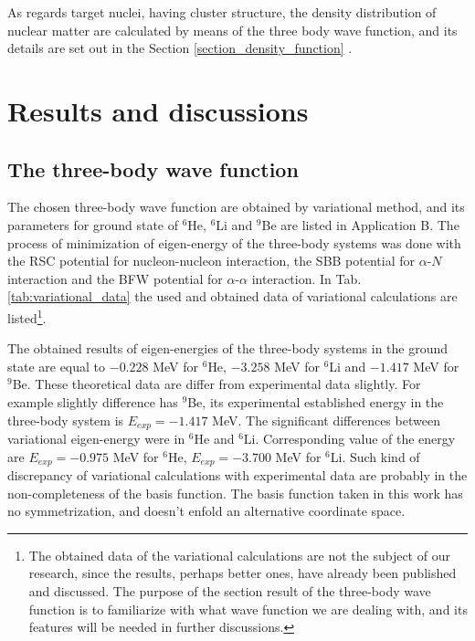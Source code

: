 \documentclass[
12pt, %
oneside, %
english, %
onehalfspacing, %
onehalfspacing, %
headsepline, %
]{MastersDoctoralThesis} %
\begin{document}
  
As regards target nuclei, having cluster structure, the density distribution of nuclear matter are calculated by means of the three body wave function, and its details are set out in the Section \ref{section_density_function} .

\chapter{Results and discussions}

\section{The three-body wave function}

The chosen three-body wave function are obtained by variational method, and its parameters for ground state of $^6$He, $^6$Li and $^9$Be are listed in Application B. The process of minimization of eigen-energy of the three-body systems was done with the RSC potential \cite{day1981three} for nucleon-nucleon interaction, the SBB potential \cite{sack1954elastic} for  $\alpha$-$N$ interaction and the BFW potential \cite{buck1977local} for $\alpha$-$\alpha$ interaction.  In Tab. \ref{tab:variational_data} the used and obtained data of variational calculations are listed\footnote{The obtained data of the variational calculations are not the subject of our research, since the results, perhaps better ones, have already been published and discussed. The purpose of  the section result of the three-body wave function   is to familiarize with what wave function we are dealing with, and its features will be needed in further discussions.}.

The obtained  results of eigen-energies of the three-body systems in the ground state are equal to $-0.228$ MeV for $^6$He, $-3.258$ MeV for $^6$Li and $-1.417$ MeV for $^9$Be. These theoretical data are differ from experimental data slightly. For example slightly difference has $^9$Be, its experimental established energy in the three-body system is $E_{exp}=-1.417$ MeV. The significant differences between variational eigen-energy were in  $^6$He  and $^6$Li. Corresponding value of the energy are  $E_{exp}=-0.975$ MeV for $^6$He,  $E_{exp}=-3.700$ MeV for $^6$Li. 
Such kind of discrepancy of variational calculations with experimental data are probably in the non-completeness of the basis function. The basis function taken in this work has no symmetrization, and doesn't enfold an alternative coordinate space.  
\end{document}
